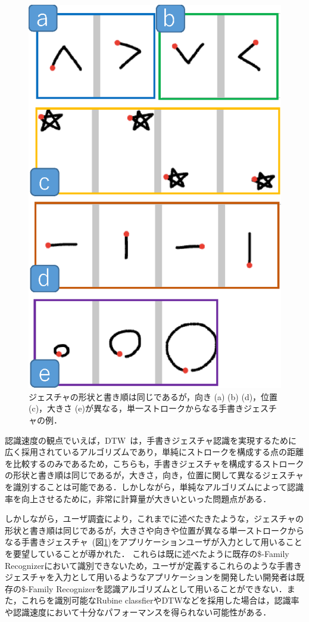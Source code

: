 \begin{figure} [htbp]
\centering
\includegraphics [width=0.5\columnwidth]{img/examples_V.eps}
\caption{ジェスチャの形状と書き順は同じであるが，向き (a) (b) (d)，位置 (c)，大きさ (e)が異なる，単一ストロークからなる手書きジェスチャの例．}
\label{fig:examples_V}
\end{figure}


認識速度の観点でいえば，DTW~\cite{Tappert:1982:CSR:1664966.1664979, Salvador:2007:TAD:1367985.1367993}は，手書きジェスチャ認識を実現するために広く採用されているアルゴリズムであり，単純にストロークを構成する点の距離を比較するのみであるため，こちらも，手書きジェスチャを構成するストロークの形状と書き順は同じであるが，大きさ，向き，位置に関して異なるジェスチャを識別することは可能である．しかしながら，単純なアルゴリズムによって認識率を向上させるために，非常に計算量が大きいといった問題点がある．

しかしながら，ユーザ調査により，これまでに述べたきたような，ジェスチャの形状と書き順は同じであるが，大きさや向きや位置が異なる単一ストロークからなる手書きジェスチャ~(図\ref{fig:examples_V})をアプリケーションユーザが入力として用いることを要望していることが導かれた．
これらは既に述べたように既存の\$-Family Recognizerにおいて識別できないため，ユーザが定義するこれらのような手書きジェスチャを入力として用いるようなアプリケーションを開発したい開発者は既存の\$-Family Recognizerを認識アルゴリズムとして用いることができない．また，これらを識別可能なRubine classfierやDTWなどを採用した場合は，認識率や認識速度において十分なパフォーマンスを得られない可能性がある．


